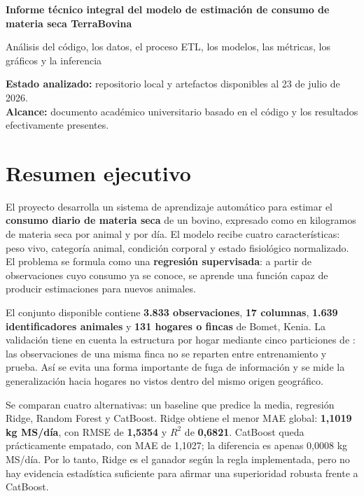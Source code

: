 \documentclass[11pt,a4paper]{article}
\newcommand{\archivo}[1]{\texttt{\detokenize{#1}}}
\begin{document}
{\LARGE\bfseries Informe técnico integral del modelo de estimación de consumo de materia seca TerraBovina}\par
\vspace{0.4em}
{\large Análisis del código, los datos, el proceso ETL, los modelos, las métricas, los gráficos y la inferencia}\par
\vspace{0.6em}
\textbf{Estado analizado:} repositorio local y artefactos disponibles al 23 de julio de 2026.\\
\textbf{Alcance:} documento académico universitario basado en el código y los resultados efectivamente presentes.

\tableofcontents
\newpage

\section{Resumen ejecutivo}

El proyecto desarrolla un sistema de aprendizaje automático para estimar el \textbf{consumo diario de materia seca} de un bovino, expresado como \archivo{dmi_kg_dia} en kilogramos de materia seca por animal y por día. El modelo recibe cuatro características: peso vivo, categoría animal, condición corporal y estado fisiológico normalizado. El problema se formula como una \textbf{regresión supervisada}: a partir de observaciones cuyo consumo ya se conoce, se aprende una función capaz de producir estimaciones para nuevos animales.

El conjunto disponible contiene \textbf{3.833 observaciones}, \textbf{17 columnas}, \textbf{1.639 identificadores animales} y \textbf{131 hogares o fincas} de Bomet, Kenia. La validación tiene en cuenta la estructura por hogar mediante cinco particiones de \archivo{StratifiedGroupKFold}: las observaciones de una misma finca no se reparten entre entrenamiento y prueba. Así se evita una forma importante de fuga de información y se mide la generalización hacia hogares no vistos dentro del mismo origen geográfico.

Se comparan cuatro alternativas: un baseline que predice la media, regresión Ridge, Random Forest y CatBoost. Ridge obtiene el menor MAE global: \textbf{1,1019 kg MS/día}, con RMSE de \textbf{1,5354} y $R^2$ de \textbf{0,6821}. CatBoost queda prácticamente empatado, con MAE de 1,1027; la diferencia es apenas 0,0008 kg MS/día. Por lo tanto, Ridge es el ganador según la regla implementada, pero no hay evidencia estadística suficiente para afirmar una superioridad robusta frente a CatBoost.
\end{document}
